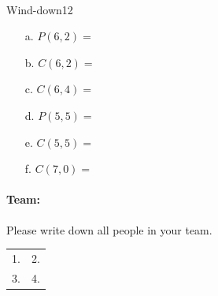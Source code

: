 \documentclass[a4paper,12pt]{book}
\begin{document}
~\\
\hrulefill{}

\begin{answersheetquestion}{7}{Wind-down}{12}
    \begin{enumerate}
        \item[a.]   $P(6, 2) =$ \iftoggle{answerkey}{ \begin{answer} $\frac{6!}{4!} = \frac{720}{24} = 30$ \end{answer} }{}
        \item[b.]   $C(6, 2) =$ \iftoggle{answerkey}{ \begin{answer} $\frac{6!}{4! \cdot 2!} = \frac{720}{(24 \cdot 2)} = 15$ \end{answer} }{}
        \item[c.]   $C(6, 4) =$ \iftoggle{answerkey}{ \begin{answer} $\frac{6!}{2! \cdot 4!} = \frac{720}{(2 \cdot 24)} = 15$ \end{answer} }{}
        \item[d.]   $P(5, 5) =$ \iftoggle{answerkey}{ \begin{answer} $\frac{5!}{5!} = \frac{120}{120} = 1$ \end{answer} }{}
        \item[e.]   $C(5, 5) =$ \iftoggle{answerkey}{ \begin{answer} $\frac{5!}{(0! \cdot 5!)} = \frac{5!}{5!} = 1$ \end{answer} }{}
        \item[f.]   $C(7, 0) =$ \iftoggle{answerkey}{ \begin{answer} $\frac{7!}{(7! \cdot 0!)} = \frac{7!}{7!} = 1$ \end{answer} }{}
    \end{enumerate}
\end{answersheetquestion}







    \newpage
    
    \paragraph{Team:}
    Please write down all people in your team. ~\\

    \begin{tabular}{ p{6cm} p{6cm} }
        1. & 2. \\
        3. & 4.
    \end{tabular}
    ~\\
\end{document}
